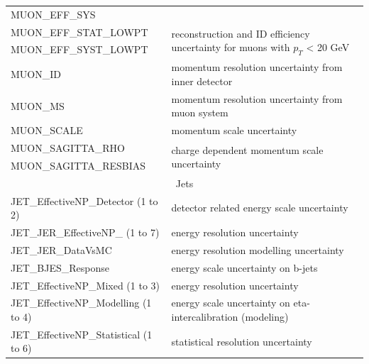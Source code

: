 \begin{table}
{\begin{tabular}{l|l}
  MUON\_EFF\_SYS                 &                                                                      \\
  MUON\_EFF\_STAT\_LOWPT         & \multirow{2}{*}{reconstruction and ID efficiency uncertainty for muons with $p_T$ < 20 GeV} \\
  MUON\_EFF\_SYST\_LOWPT         &                                                                      \\
  MUON\_ID                       & momentum resolution uncertainty from inner detector                  \\
  MUON\_MS                       & momentum resolution uncertainty from muon system                     \\
  MUON\_SCALE                    & momentum scale uncertainty                                           \\
  MUON\_SAGITTA\_RHO             & \multirow{2}{*}{charge dependent momentum scale uncertainty}         \\
  MUON\_SAGITTA\_RESBIAS         &                                                                      \\
  \hline
  \multicolumn{2}{c}{Jets}\\
  \hline         
  JET\_EffectiveNP\_Detector (1 to 2) & detector related energy scale uncertainty \\
  JET\_JER\_EffectiveNP\_ (1 to 7) & energy resolution uncertainty  \\
  JET\_JER\_DataVsMC 	& energy resolution modelling uncertainty \\
  JET\_BJES\_Response & energy scale uncertainty on b-jets \\
  JET\_EffectiveNP\_Mixed (1 to 3) & energy resolution uncertainty \\
  JET\_EffectiveNP\_Modelling (1 to 4) &  energy scale uncertainty on eta-intercalibration (modeling) \\
  JET\_EffectiveNP\_Statistical (1 to 6) &  statistical resolution uncertainty \\

\end{tabular}}
\end{table}

